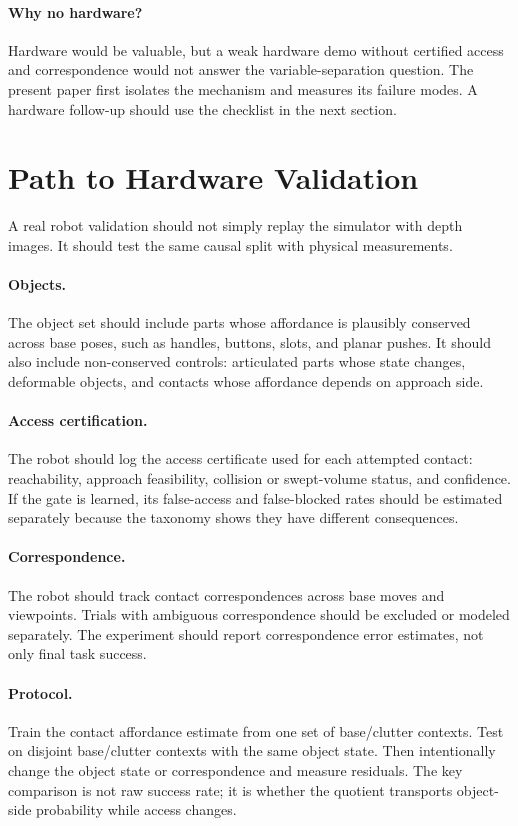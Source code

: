 \documentclass{article}
\begin{document}
\paragraph{Why no hardware?}
Hardware would be valuable, but a weak hardware demo without certified access and correspondence would not answer the variable-separation question. The present paper first isolates the mechanism and measures its failure modes. A hardware follow-up should use the checklist in the next section.

\section{Path to Hardware Validation}

A real robot validation should not simply replay the simulator with depth images. It should test the same causal split with physical measurements.

\paragraph{Objects.}
The object set should include parts whose affordance is plausibly conserved across base poses, such as handles, buttons, slots, and planar pushes. It should also include non-conserved controls: articulated parts whose state changes, deformable objects, and contacts whose affordance depends on approach side.

\paragraph{Access certification.}
The robot should log the access certificate used for each attempted contact: reachability, approach feasibility, collision or swept-volume status, and confidence. If the gate is learned, its false-access and false-blocked rates should be estimated separately because the taxonomy shows they have different consequences.

\paragraph{Correspondence.}
The robot should track contact correspondences across base moves and viewpoints. Trials with ambiguous correspondence should be excluded or modeled separately. The experiment should report correspondence error estimates, not only final task success.

\paragraph{Protocol.}
Train the contact affordance estimate from one set of base/clutter contexts. Test on disjoint base/clutter contexts with the same object state. Then intentionally change the object state or correspondence and measure residuals. The key comparison is not raw success rate; it is whether the quotient transports object-side probability while access changes.
\end{document}
